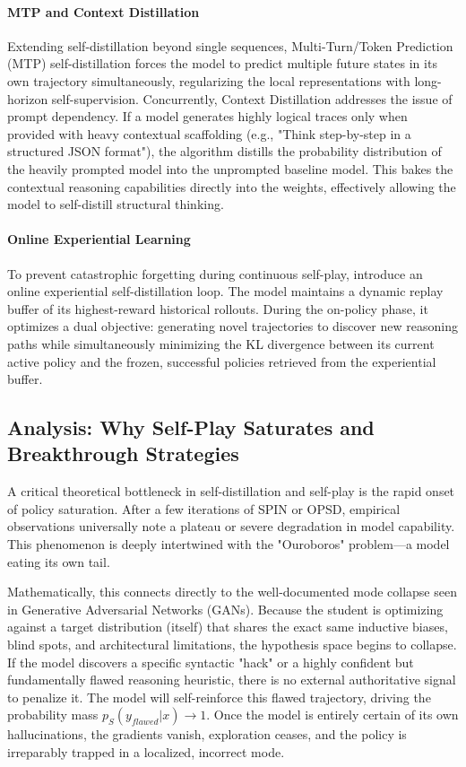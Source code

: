 \documentclass{article} %
\begin{document}
\paragraph{MTP and Context Distillation}
Extending self-distillation beyond single sequences, Multi-Turn/Token Prediction (MTP) self-distillation \citep{2602.06019} forces the model to predict multiple future states in its own trajectory simultaneously, regularizing the local representations with long-horizon self-supervision. Concurrently, Context Distillation \citep{2602.12275} addresses the issue of prompt dependency. If a model generates highly logical traces only when provided with heavy contextual scaffolding (e.g., "Think step-by-step in a structured JSON format"), the algorithm distills the probability distribution of the heavily prompted model into the unprompted baseline model. This bakes the contextual reasoning capabilities directly into the weights, effectively allowing the model to self-distill structural thinking.

\paragraph{Online Experiential Learning}
To prevent catastrophic forgetting during continuous self-play, \citet{2603.16856} introduce an online experiential self-distillation loop. The model maintains a dynamic replay buffer of its highest-reward historical rollouts. During the on-policy phase, it optimizes a dual objective: generating novel trajectories to discover new reasoning paths while simultaneously minimizing the KL divergence between its current active policy and the frozen, successful policies retrieved from the experiential buffer.

\subsection{Analysis: Why Self-Play Saturates and Breakthrough Strategies}
\label{subsec:saturation_analysis}

A critical theoretical bottleneck in self-distillation and self-play is the rapid onset of policy saturation. After a few iterations of SPIN or OPSD, empirical observations universally note a plateau or severe degradation in model capability. This phenomenon is deeply intertwined with the "Ouroboros" problem—a model eating its own tail.

Mathematically, this connects directly to the well-documented mode collapse seen in Generative Adversarial Networks (GANs). Because the student is optimizing against a target distribution (itself) that shares the exact same inductive biases, blind spots, and architectural limitations, the hypothesis space begins to collapse. If the model discovers a specific syntactic "hack" or a highly confident but fundamentally flawed reasoning heuristic, there is no external authoritative signal to penalize it. The model will self-reinforce this flawed trajectory, driving the probability mass $p_S(y_{flawed}|x) \to 1$. Once the model is entirely certain of its own hallucinations, the gradients vanish, exploration ceases, and the policy is irreparably trapped in a localized, incorrect mode.
\end{document}
